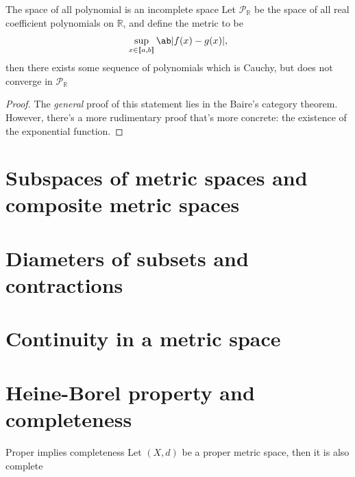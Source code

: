 \begin{cor}{The space of all polynomial is an incomplete space}{}
  Let \(\mathcal{P}_{\mathbb{R}}\) be the space of all real coefficient polynomials on
  \(\mathbb{R}\), and define the metric to be
  \begin{equation}
    \sup_{x \in \cintv{a, b}} \ab|f(x) - g(x)|,
  \end{equation}
  then there exists some sequence of polynomials which is Cauchy, but does not converge
  in \(\mathcal{P}_{\mathbb{R}}\)
\end{cor}

\begin{proof}
  The \emph{general} proof of this statement lies in the Baire's category theorem. However,
  there's a more rudimentary proof that's more concrete: the existence of the exponential function.
\end{proof}

\section{Subspaces of metric spaces and composite metric spaces}

\section{Diameters of subsets and contractions}

\section{Continuity in a metric space}

\section{Heine-Borel property and completeness}

\begin{theorem}{Proper implies completeness}{}
  Let \((X, d)\) be a proper metric space, then it is also complete
\end{theorem}
